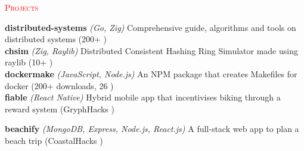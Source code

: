 \documentclass[a4paper]{article}
\newcommand{\lineunder} {
    \vspace*{-8pt} \\
    \hspace*{-18pt} \hrulefill \\
}
\newcommand{\header} [1] {
    {\hspace*{-18pt}\vspace*{6pt} \textsc{#1}}
    \vspace*{-6pt} {\color{red}{\lineunder}}
}
\begin{document}
\vspace{2.5mm}
\header{{\faCode} \textcolor{red}{Projects}}
\vspace{0.5mm}

{\textbf{distributed-systems}} {\sl (Go, Zig)} Comprehensive guide, algorithms and tools on distributed systems (200+ {\faStar}) \hfill \href{https://github.com/basilysf1709/distributed-systems}{\large{\faLink}} \href{https://github.com/basilysf1709/distributed-systems}{\large{\faGithub}}\\



{\textbf{chsim}} {\sl (Zig, Raylib)}
Distributed Consistent Hashing Ring Simulator made using raylib (10+ {\faStar}) \hfill \href{https://www.stackwise.ai/stacks}{\large{\faLink}} \href{https://github.com/stackwiseai/stackwise}{\large{\faGithub}}\\

{\textbf{dockermake}} {\sl (JavaScript, Node.js)} An NPM package that creates Makefiles for docker (200$+$ downloads, 26 {\faStar}) \hfill \href{https://www.npmjs.com/package/dockermake}{\large{\faDownload}} \href{https://github.com/basilysf1709/dockermake}{\large{\faGithub}}\\

{\textbf{fiable}} {\sl (React Native)} Hybrid mobile app that incentivises biking through a reward system (GryphHacks {\faTrophy})\hfill \href{https://devpost.com/software/fiable}{\large{\faTrophy}} \href{https://devpost.com/software/fiable}{\large{\faGithub}}\\
\vspace{0.5mm}

{\textbf{beachify}} {\sl (MongoDB, Express, Node.js, React.js)} A full-stack web app to plan a beach trip (CoastalHacks {\faTrophy})\hfill \href{https://devpost.com/software/beachify-e1k98y}{\large{\faTrophy}} \href{https://github.com/basilysf1709/beachify}{\large{\faGithub}}\\

\vspace{0.5mm} 
\vspace{1mm}

\vspace*{2mm}

\ 
\end{document}
